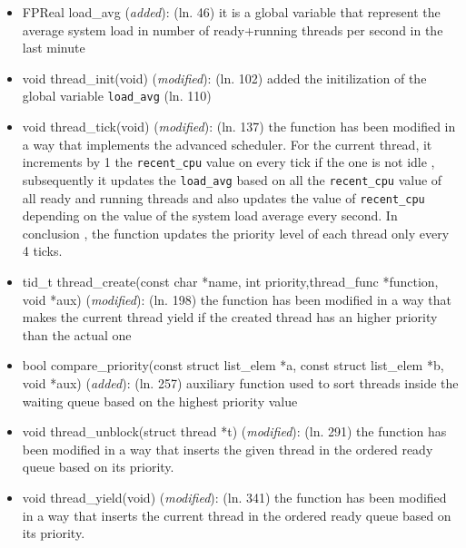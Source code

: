 \documentclass[11pt]{scrartcl}
\begin{document}
\begin{itemize} 
    \item FPReal load\_avg  (\textit{added}): \newline
    (ln. 46) it is a global variable that represent the average system load in number of ready+running threads per second in the last
	minute
	\item void thread\_init(void) (\textit{modified}): \newline
	(ln. 102) added the initilization of the global variable \texttt{load\_avg} (ln. 110)
	\item void thread\_tick(void) (\textit{modified}): \newline
	(ln. 137) the function has been modified in a way that implements the advanced scheduler. For the current thread, 
	it increments by 1 the \texttt{recent\_cpu} value on every tick if the one is not idle , subsequently it updates the \texttt{load\_avg} based on all the \texttt{recent\_cpu} value of all ready and running threads and also updates the value of \texttt{recent\_cpu} 
	depending on the value of the system load average every second. In conclusion , the function updates the priority level of each thread only every 4 ticks.   

	\item tid\_t thread\_create(const char *name, int priority,thread\_func *function, void *aux) (\textit{modified}): \newline %
	(ln. 198) the function has been modified in a way that makes the current thread yield if the created thread has an higher priority than the actual one 
	\item bool compare\_priority(const struct list\_elem *a, const struct list\_elem *b, void *aux) (\textit{added}): \newline 
	(ln. 257) auxiliary function used to sort threads inside the waiting queue based on the highest priority value

	\item void thread\_unblock(struct thread *t) (\textit{modified}): \newline 
	(ln. 291) the function has been modified in a way that inserts the given thread in the ordered ready queue based on its priority. 
	\item void thread\_yield(void) (\textit{modified}): \newline 
	(ln. 341) the function has been modified in a way that inserts the current thread in the ordered ready queue based on its priority. 
	

\end{itemize}
\end{document}
